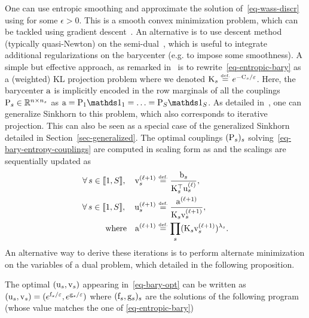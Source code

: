 
One can use entropic smoothing and approximate the solution of~\eqref{eq-wass-discr} using 
for some $\epsilon>0$. 
%
This is a smooth convex minimization problem, which can be tackled using gradient descent~\cite{CuturiBarycenter}. An alternative is to use descent method (typically quasi-Newton) on the semi-dual~\cite{2016-Cuturi-siims}, which is useful to integrate additional regularizations on the barycenter (e.g. to impose some smoothness).
%
A simple but effective approach, as remarked in~\cite{2015-benamou-cisc} is to rewrite~\eqref{eq-entropic-bary} as a (weighted) KL projection problem
where we denoted $\K_s \eqdef e^{-\C_s/\epsilon}$. Here, the barycenter $\a$ is implicitly encoded in the row marginals of all the couplings $\P_s \in \RR^{n \times n_s}$ as $\a = \P_1\ones_1 =  \ldots = \P_S\ones_S$.
%
As detailed in~\cite{2015-benamou-cisc}, one can generalize Sinkhorn to this problem, which also corresponds to iterative projection. This can also be seen as a special case of the generalized Sinkhorn detailed in Section~\ref{sec-generalized}.
%
The optimal couplings $(\P_s)_s$ solving~\eqref{eq-bary-entropy-couplings} are computed in scaling form as 
and the scalings are sequentially updated as
\begin{align}\label{eq-sinkhorn-bary}
	\foralls s \in \range{1,S}, \quad \itt{\vD}_s &\eqdef \frac{\b_s}{\transp{\K}_s \it{\uD}_s}, \\
	\foralls s \in \range{1,S}, \quad  \itt{\uD}_s &\eqdef \frac{\itt{\a}}{\K_s \itt{\vD}_s}, \label{eq-sinkhorn-bary-2}\\
		\qwhereq
		\itt{\a} &\eqdef \prod_s (  \K_s \itt{\vD}_s )^{\la_s}. \label{eq-sinkhorn-bary-3}
\end{align}
An alternative way to derive these iterations is to perform alternate minimization on the variables of a dual problem, which detailed in the following proposition.

\begin{prop}
	The optimal $(\uD_s,\vD_s)$ appearing in~\eqref{eq-bary-opt} can be written as $(\uD_s,\vD_s) = ( e^{\fD_s/\epsilon},e^{\gD_s/\epsilon} )$ where $( \fD_s,\gD_s )_s$ are the solutions of the following program (whose value matches the one of \eqref{eq-entropic-bary})
\end{prop}

